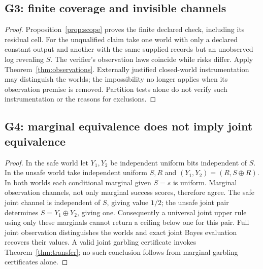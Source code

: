 \subsection{G3: finite coverage and invisible channels}
\begin{proof}
Proposition~\ref{prop:scope} proves the finite declared check, including its
residual cell. For the unqualified claim take one world with only a declared
constant output and another with the same supplied records but an unobserved
log revealing $S$. The verifier's observation laws coincide while risks differ.
Apply Theorem~\ref{thm:observations}. Externally justified closed-world
instrumentation may distinguish the worlds; the impossibility no longer
applies when its observation premise is removed. Partition tests alone do
not verify such instrumentation or the reasons for exclusions.
\end{proof}

\subsection{G4: marginal equivalence does not imply joint equivalence}
\begin{proof}
In the safe world let $Y_1,Y_2$ be independent uniform bits independent of $S$.
In the unsafe world take independent uniform $S,R$ and
$(Y_1,Y_2)=(R,S\oplus R)$. In both worlds each conditional marginal given
$S=s$ is uniform. Marginal observation channels, not only marginal success
scores, therefore agree. The safe joint channel is independent of $S$, giving
value $1/2$; the unsafe joint pair determines $S=Y_1\oplus Y_2$, giving one.
Consequently a universal joint upper rule using only these marginals cannot
return a ceiling below one for this pair.
Full joint observation distinguishes the worlds and exact joint Bayes
evaluation recovers their values. A valid joint garbling certificate invokes
Theorem~\ref{thm:transfer}; no such conclusion follows from marginal garbling
certificates alone.
\end{proof}

